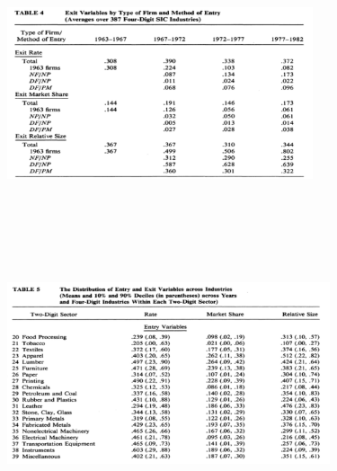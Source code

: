 \documentclass[dvipdfmx,12pt]{beamer}
\begin{document}
\begin{frame}

\begin{center}

\includegraphics[width=9cm,height=7.75cm]{DRS_T4.pdf}

\end{center}

\end{frame}

\begin{frame}

\begin{center}

\includegraphics[width=9.5cm,height=7.75cm]{DRS_T5a.pdf}

\end{center}

\end{frame}
\end{document}

